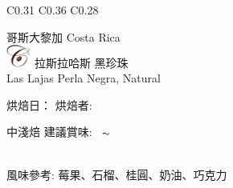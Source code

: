 \documentclass[10pt,a4paper]{article}
\begin{document}
\begin{tabular}{C{0.31\textwidth} C{0.36\textwidth} C{0.28\textwidth}}
{{哥斯大黎加 %
\large
Costa Rica%
}\\
{ \hspace*{-0.66cm}\includegraphics[trim=0 20em 0 -20em,width=0.06\textwidth]{NEWC.png}%
\Large \hspace*{0.1em} \vspace*{0.15cm}  
\hspace*{0.1em}拉斯拉哈斯  黑珍珠%
}\vspace*{0.15em}\\
{ 
Las Lajas Perla Negra, Natural   %
}\vspace*{0.25em}\\
\setdatetoday \addtocounter{datenumber}{
-1%
}\setdatebynumber{\thedatenumber}
{\scriptsize 烘焙日：{\scriptsize\datedate}\hspace{0.3em}%
烘焙者: \textbf{\scriptsize{}}}\vspace*{-0.3em}\\
 \addtocounter{datenumber}{
5 }%
\setdatebynumber{\thedatenumber} 
{\normalsize 
中淺焙%
\enskip \scriptsize 建議賞味:} \scriptsize{\datemonthname ~\thedateday}$\thicksim$\addtocounter{datenumber}{55}\setdatebynumber{\thedatenumber} \datedate
\\\scriptsize 風味參考: 莓果、石榴、桂圓、奶油、巧克力
}
\end{tabular}
\end{document}
